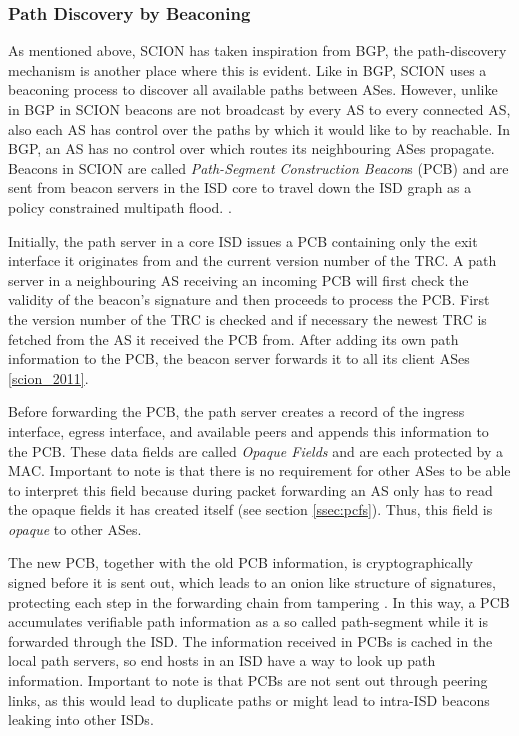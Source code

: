 \documentclass[../eva1_scion.tex]{subfiles}
\begin{document}
    \subsubsection{Path Discovery by Beaconing}\label{sssec:beaconing}
    As mentioned above, SCION has taken inspiration from BGP, the path-discovery mechanism is another place where this is evident. Like in BGP, SCION uses a beaconing process to discover all available paths between ASes. However, unlike in BGP in SCION beacons are not broadcast by every AS to every connected AS, also each AS has control over the paths by which it would like to by reachable. In BGP, an AS has no control over which routes its neighbouring ASes propagate. Beacons in SCION are called \textit{Path-Segment Construction Beacon}s (PCB) and are  sent from beacon servers in the ISD core to travel down the ISD graph as a policy constrained multipath flood. \cite{scion_2011}.

    Initially, the path server in a core ISD issues a PCB containing only the exit interface it originates from and the current version number of the TRC. A path server in a neighbouring AS receiving an incoming PCB will first check the validity of the beacon's signature and then proceeds to process the PCB. First the version number of the TRC is checked and if necessary the newest TRC is fetched  from the AS it received the PCB from. After adding its own path information to the PCB, the beacon server forwards it to all its client ASes \ref{scion_2011}.

    Before forwarding the PCB, the path server creates a record of the ingress interface, egress interface, and available peers and  appends this information to the PCB. These data fields are called \textit{Opaque Fields} and are each protected by a MAC. Important to note is that  there is no requirement for other ASes to be able to interpret this field because during packet forwarding an AS only has to read  the opaque fields it has created itself (see section \ref{ssec:pcfs}). Thus, this field is \textit{opaque} to other ASes. 

    The new PCB, together with the old PCB information, is cryptographically signed before it is sent out, which leads to an onion like structure of signatures, protecting each step in the forwarding chain from tampering \cite{scion_2011}. In this way, a PCB accumulates verifiable path information as a so called path-segment while it is forwarded through the ISD. The information received in PCBs is cached in the local path servers, so end hosts in an ISD have a way to look up path information. Important to note is that PCBs are not sent out through peering links, as this would lead to duplicate paths or might lead to intra-ISD beacons leaking into other ISDs.
\end{document}

